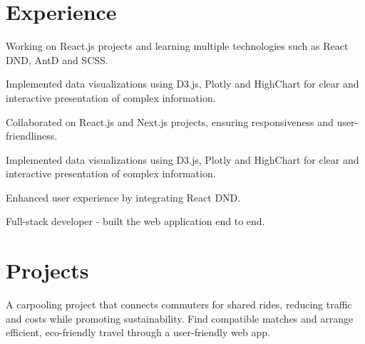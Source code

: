 \documentclass[]{deedy-resume-openfont}
\begin{document}
\hfill
\begin{minipage}[t]{0.66\textwidth}

\section{Experience}

\vspace{\topsep} %
\begin{tightemize}
\item Working on React.js projects and learning multiple technologies such as React DND, AntD and SCSS.
\item Implemented data visualizations using D3.js, Plotly and HighChart for clear and interactive presentation of complex information.
\end{tightemize}
\sectionsep

\begin{tightemize}
\item Collaborated on React.js and Next.js projects, ensuring responsiveness and user-friendliness.
\item Implemented data visualizations using D3.js, Plotly and HighChart for clear and interactive presentation of complex information.
\item Enhanced user experience by integrating React DND.
\end{tightemize}
\sectionsep

\begin{tightemize}
\item Full-stack developer - built the web application end to end.
\end{tightemize}
\sectionsep

\section{Projects}

\begin{tightemize}
\item A carpooling project that connects commuters for shared rides, reducing traffic and costs while promoting sustainability. Find compatible matches and arrange efficient, eco-friendly travel through a user-friendly web app.
\end{tightemize}
\sectionsep


\end{minipage}
\end{document}
